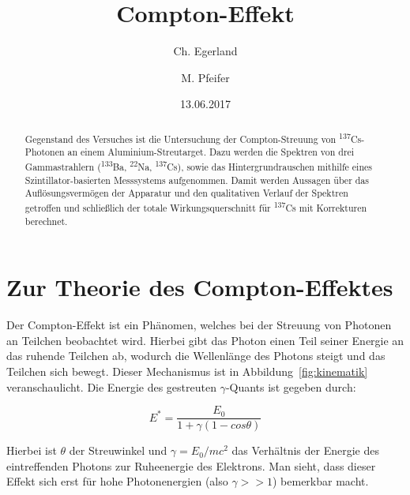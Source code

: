\documentclass[aps,twocolumn,secnumarabic,nobalancelastpage,amsmath,amssymb,
nofootinbib,superscriptaddress]{revtex4-1}
\begin{document}
\title{Compton-Effekt}
\author         {Ch. Egerland}
\author         {M. Pfeifer}

\date[Versuchsdatum: ]{13.06.2017}

\begin{abstract}
  \noindent Gegenstand des Versuches ist die Untersuchung der Compton-Streuung von \textsuperscript{137}Cs-Photonen an einem Aluminium-Streutarget.
  Dazu werden die Spektren von drei Gammastrahlern (\textsuperscript{133}Ba, \textsuperscript{22}Na, \textsuperscript{137}Cs), sowie das Hintergrundrauschen
  mithilfe eines Szintillator-basierten Messsystems aufgenommen. Damit werden Aussagen über das Auflösungsvermögen der Apparatur und den qualitativen Verlauf der
  Spektren getroffen und schließlich der totale Wirkungsquerschnitt für \textsuperscript{137}Cs mit Korrekturen berechnet.
\end{abstract}


\maketitle



\section{Zur Theorie des Compton-Effektes}
Der Compton-Effekt ist ein Phänomen, welches bei der Streuung von Photonen an
Teilchen beobachtet wird. Hierbei gibt das Photon einen Teil seiner Energie an das
ruhende Teilchen ab, wodurch die Wellenlänge des Photons steigt und das Teilchen
sich bewegt. Dieser Mechanismus ist in Abbildung~\ref{fig:kinematik} veranschaulicht.
Die Energie des gestreuten $\gamma$-Quants ist gegeben durch:

  \begin{equation}
    E^* = \frac{E_0}{1+\gamma(1- cos \theta)}
    \label{eq:streuenergie}
  \end{equation}

Hierbei ist $\theta$ der Streuwinkel und $\gamma = E_0/mc^2$ das Verhältnis der
Energie des eintreffenden Photons zur Ruheenergie des Elektrons. Man sieht, dass
dieser Effekt sich erst für hohe Photonenergien (also $\gamma >> 1$) bemerkbar
macht.
\end{document}
